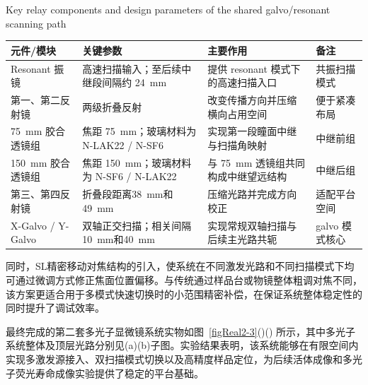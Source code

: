 \begin{table}[htbp]
    \centering
    \small
    \setlength{\tabcolsep}{4pt}
    \renewcommand{\arraystretch}{1.15}
    {Key relay components and design parameters of the shared galvo/resonant scanning path}
    \label{tab:RelayParam}
    \begin{tabularx}{\textwidth}{p{2.5cm} p{3.4cm} X p{1.8cm}}
        \hline
        元件/模块 & 关键参数 & 主要作用 & 备注 \\
        \hline
        Resonant 振镜 & 高速扫描输入；至后续中继段间隔约 24~mm & 提供 resonant 模式下的高速扫描入口 & 共振扫描模式 \\
        \hline
        第一、第二反射镜 & 两级折叠反射 & 改变传播方向并压缩横向占用空间 & 便于紧凑布局 \\
        \hline
        75~mm 胶合透镜组 & 焦距 75~mm；玻璃材料为 N-LAK22 / N-SF6 & 实现第一段瞳面中继与扫描角映射 & 中继前组 \\
        \hline
        150~mm 胶合透镜组 & 焦距 150~mm；玻璃材料为 N-SF6 / N-LAK22 & 与 75~mm 透镜组共同构成中继望远结构 & 中继后组 \\
        \hline
        第三、第四反射镜 & 折叠段距离38~mm和49~mm & 压缩光路并完成方向校正 & 适配平台空间 \\
        \hline
        X-Galvo / Y-Galvo & 双轴正交扫描；相关间隔10~mm和40~mm & 实现常规双轴扫描与后续主光路共轭 & galvo 模式核心 \\
        \hline
    \end{tabularx}
\end{table}


同时，SL精密移动对焦结构的引入，使系统在不同激发光路和不同扫描模式下均可通过微调方式修正焦面位置偏移。与传统通过样品台或物镜整体粗调对焦不同，该方案更适合用于多模式快速切换时的小范围精密补偿，在保证系统整体稳定性的同时提升了调试效率。

最终完成的第二套多光子显微镜系统实物如图~\ref{figReal2-3}()() 所示，其中多光子系统整体及顶层光路分别见(a)(b)子图。实验结果表明，该系统能够在有限空间内实现多激发源接入、双扫描模式切换以及高精度样品定位，为后续活体成像和多光子荧光寿命成像实验提供了稳定的平台基础。

